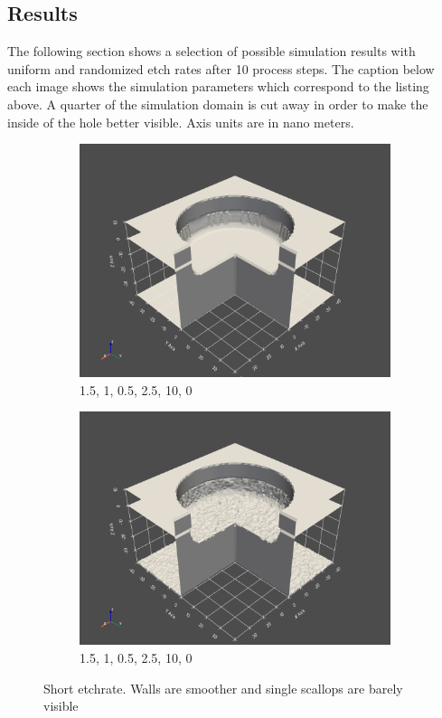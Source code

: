 \subsection{Results}
The following section shows a selection of possible simulation results with uniform and randomized etch rates after 10 process steps.
The caption below each image shows the simulation parameters which correspond to the listing above.
A quarter of the simulation domain is cut away in order to make the inside of the hole better visible.
Axis units are in nano meters.
\begin{figure}[h]
    \begin{subfigure}{0.45\textwidth}
    \includegraphics[width=1\linewidth]{res/task2.2_uniformShort.png} 
    \caption{1.5, 1, 0.5, 2.5, 10, 0}
    
\end{subfigure}
    \begin{subfigure}{0.45\textwidth}
    \includegraphics[width=1\linewidth]{res/task2.2_randomShort.png}
    \caption{1.5, 1, 0.5, 2.5, 10, 0}
\end{subfigure}

\caption{Short etchrate. Walls are smoother and single scallops are barely visible}
\end{figure}


